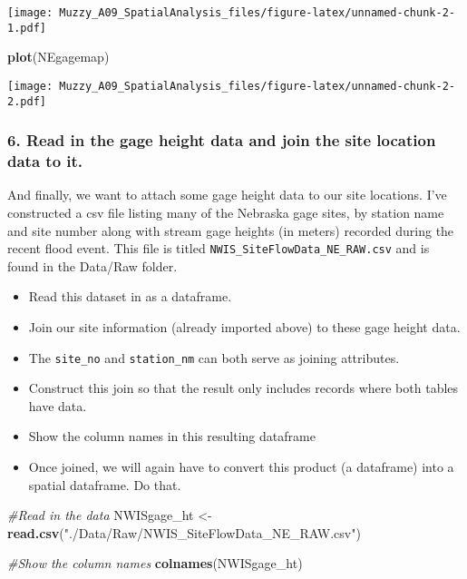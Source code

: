 \documentclass[]{article}
\newenvironment{Shaded}{\begin{snugshade}}{\end{snugshade}}
\newcommand{\KeywordTok}[1]{\textcolor[rgb]{0.13,0.29,0.53}{\textbf{#1}}}
\newcommand{\StringTok}[1]{\textcolor[rgb]{0.31,0.60,0.02}{#1}}
\newcommand{\CommentTok}[1]{\textcolor[rgb]{0.56,0.35,0.01}{\textit{#1}}}
\newcommand{\NormalTok}[1]{#1}
\providecommand{\tightlist}{%
  \setlength{\itemsep}{0pt}\setlength{\parskip}{0pt}}
\begin{document}
\texttt{[image: Muzzy\_A09\_SpatialAnalysis\_files/figure-latex/unnamed-chunk-2-1.pdf]}

\begin{Shaded}
\begin{Highlighting}[]
  \KeywordTok{plot}\NormalTok{(NEgagemap)}
\end{Highlighting}
\end{Shaded}

\texttt{[image: Muzzy\_A09\_SpatialAnalysis\_files/figure-latex/unnamed-chunk-2-2.pdf]}

\subsubsection{6. Read in the gage height data and join the site
location data to
it.}\label{read-in-the-gage-height-data-and-join-the-site-location-data-to-it.}

And finally, we want to attach some gage height data to our site
locations. I've constructed a csv file listing many of the Nebraska gage
sites, by station name and site number along with stream gage heights
(in meters) recorded during the recent flood event. This file is titled
\texttt{NWIS\_SiteFlowData\_NE\_RAW.csv} and is found in the Data/Raw
folder.

\begin{itemize}
\tightlist
\item
  Read this dataset in as a dataframe.
\item
  Join our site information (already imported above) to these gage
  height data.
\item
  The \texttt{site\_no} and \texttt{station\_nm} can both serve as
  joining attributes.
\item
  Construct this join so that the result only includes records where
  both tables have data.
\item
  Show the column names in this resulting dataframe
\item
  Once joined, we will again have to convert this product (a dataframe)
  into a spatial dataframe. Do that.
\end{itemize}

\begin{Shaded}
\begin{Highlighting}[]
\CommentTok{#Read in the data}
\NormalTok{NWISgage_ht <-}\StringTok{ }\KeywordTok{read.csv}\NormalTok{(}\StringTok{"./Data/Raw/NWIS_SiteFlowData_NE_RAW.csv"}\NormalTok{)}

\CommentTok{#Show the column names}
\KeywordTok{colnames}\NormalTok{(NWISgage_ht)}
\end{Highlighting}
\end{Shaded}
\end{document}
